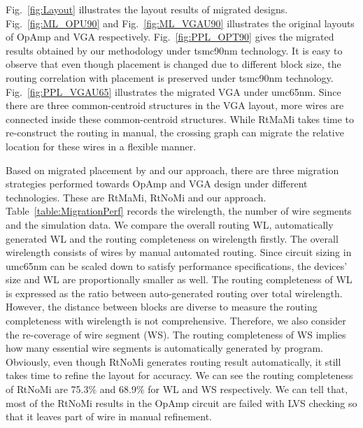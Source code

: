     Fig.~\ref{fig:Layout} illustrates the layout results of migrated designs. Fig.~\ref{fig:ML_OPU90} and Fig.~\ref{fig:ML_VGAU90} illustrates the original layouts of OpAmp and VGA respectively. Fig.~\ref{fig:PPL_OPT90} gives the migrated results obtained by our methodology under tsmc90nm technology. It is easy to observe that even though placement is changed due to different block size, the routing correlation with placement is preserved under tsmc90nm technology. Fig.~\ref{fig:PPL_VGAU65} illustrates the migrated VGA under umc65nm. Since there are three common-centroid structures in the VGA layout, more wires are connected inside these common-centroid structures. While RtMaMi takes time to re-construct the routing in manual, the crossing graph can migrate the relative location for these wires in a flexible manner.


    Based on migrated placement by \cite{msc-bhattacharya-tcad06} and our approach, there are three migration strategies performed towards OpAmp and VGA design under different technologies. These are RtMaMi, RtNoMi and our approach. Table~\ref{table:MigrationPerf} records the wirelength, the number of wire segments and the simulation data. We compare the overall routing WL, automatically generated WL and the routing completeness on wirelength firstly. The overall wirelength consists of wires by manual automated routing. Since circuit sizing in umc65nm can be scaled down to satisfy performance specifications, the devices' size and WL are proportionally smaller as well. The routing completeness of WL is expressed as the ratio between auto-generated routing over total wirelength. However, the distance between blocks are diverse to measure the routing completeness with wirelength is not comprehensive. Therefore, we also consider the re-coverage of wire segment (WS). The routing completeness of WS implies how many essential wire segments is automatically generated by program. Obviously, even though RtNoMi generates routing result automatically, it still takes time to refine the layout for accuracy. We can see the routing completeness of RtNoMi are 75.3\% and 68.9\% for WL and WS respectively. We can tell that, most of the RtNoMi results in the OpAmp circuit are failed with LVS checking so that it leaves part of wire in manual refinement.


